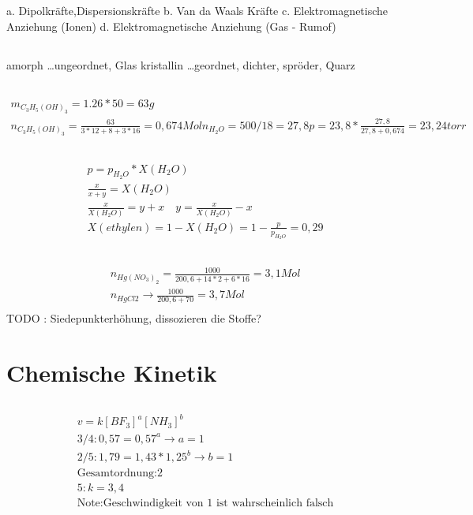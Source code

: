 \documentclass[a4paper]{article}
\begin{document}
\subsection{}
a. Dipolkräfte,Dispersionskräfte
b. Van da Waals Kräfte
c. Elektromagnetische Anziehung (Ionen)
d. Elektromagnetische Anziehung (Gas - Rumof)

\subsection{}
amorph \dots ungeordnet, Glas
kristallin \dots geordnet, dichter, spröder, Quarz

\subsection{}
\begin{align}
  m_{C_3H_5(OH)_3}=1.26*50=63g\\
  n_{C_3H_5(OH)_3}=\frac{63}{3*12+8+3*16}=0,674Mol
  n_{H_2O}=500/18=27,8
  p=23,8*\frac{27,8}{27,8+0,674}= 23,24 torr
\end{align}

\subsection{}
\begin{align}
  p=p_{H_2O}*X(H_2O)\\
  \frac{x}{x+y}=X(H_2O)\\
  \frac{x}{X(H_2O)}=y+x \quad y=\frac{x}{X(H_2O)}-x\\
  X(ethylen)=1-X(H_2O)=1-\frac{p}{p_{H_2O}}=0,29
\end{align}

\subsection{}
\begin{align}
n_{Hg(NO_3)_2}=\frac{1000}{200,6+14*2+6*16}=3,1 Mol\\
n_{HgCl2} \rightarrow \frac{1000}{200,6+70}=3,7Mol\\
\end{align}
TODO : Siedepunkterhöhung, dissozieren die Stoffe?

\section{Chemische Kinetik}
\subsection{}
\begin{align}
  v=k [BF_3]^a[NH_3]^b\\
  3/4:0,57=0,57^a \rightarrow a=1\\
  2/5:1,79=1,43*1,25^b \rightarrow b=1\\
  \text{Gesamtordnung:2}\\
  5:k=3,4\\
  \text{Note:Geschwindigkeit von 1 ist wahrscheinlich falsch}
\end{align}
\end{document}
